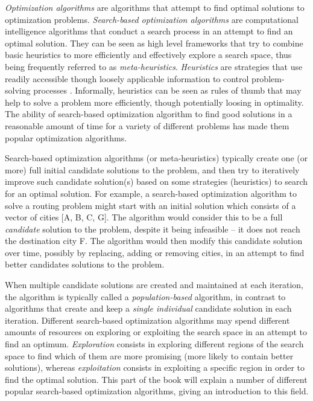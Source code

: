 \textit{Optimization algorithms} are algorithms that attempt to find optimal solutions to optimization problems. \textit{Search-based optimization algorithms} are computational intelligence algorithms that conduct a search process in an attempt to find an optimal solution. They can be seen as high level frameworks that try to combine basic heuristics to more efficiently and effectively explore a search space, thus being frequently referred to as \textit{meta-heuristics}. \textit{Heuristics} are strategies that use readily accessible though loosely applicable information to control problem-solving processes \cite{heuristics}. Informally, heuristics can be seen as rules of thumb that may help to solve a problem more efficiently, though potentially loosing in optimality. The ability of search-based optimization algorithm to find good solutions in a reasonable amount of time for a variety of different problems has made them popular optimization algorithms. 

Search-based optimization algorithms (or meta-heuristics) typically create one (or more) full initial candidate solutions to the problem, and then try to iteratively improve such candidate solution(s) based on some strategies (heuristics) to search for an optimal solution. For example, a search-based optimization algorithm to solve a routing problem might start with an initial solution which consists of a vector of cities [A, B, C, G]. The algorithm would consider this to be a full \textit{candidate} solution to the problem, despite it being infeasible -- it does not reach the destination city F. The algorithm would then modify this candidate solution over time, possibly by replacing, adding or removing cities, in an attempt to find better candidates solutions to the problem. 

When multiple candidate solutions are created and maintained at each iteration, the algorithm is typically called a \textit{population-based} algorithm, in contrast to algorithms that create and keep a \textit{single individual} candidate solution in each iteration. Different search-based optimization algorithms may spend different amounts of resources on exploring or exploiting the search space in an attempt to find an optimum. \textit{Exploration} consists in exploring different regions of the search space to find which of them are more promising (more likely to contain better solutions), whereas \textit{exploitation} consists in exploiting a specific region in order to find the optimal solution. This part of the book will explain a number of different popular search-based optimization algorithms, giving an introduction to this field.



